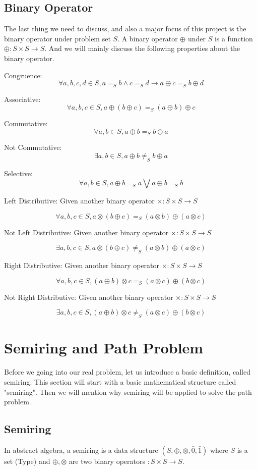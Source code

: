 \documentclass[a4paper,10pt]{article}
\newcommand{\e}[2]{
\begin{equation}
  \label{#1} 
  #2
\end{equation}
}
\begin{document}
\subsection{Binary Operator}
The last thing we need to discuss, and also a major focus of this project is the binary operator under problem set $S$. A binary operator $\oplus$ under $S$ is a function $\oplus : S \times S \rightarrow S$. And we will mainly discuss the following  properties about the binary operator.

Congruence: \e{def:bop:congruence}{\forall a,b,c,d \in S, a =_S b \wedge c =_S d \rightarrow a \oplus c =_S b \oplus d}
Associative: \e{def:bop:associative}{\forall a,b,c \in S, a \oplus (b \oplus c) =_S (a \oplus b) \oplus c}
Commutative: \e{def:bop:commutative}{\forall a,b \in S, a \oplus b =_S b \oplus a}
Not Commutative: \e{def:bop:not_commutative}{\exists a,b \in S, a \oplus b \neq_S b \oplus a}
Selective: \e{def:bop:selective}{\forall a,b \in S, a \oplus b =_S a \bigvee a \oplus b =_S b}
Left Distributive: Given another binary operator $\times : S \times S \rightarrow S$
\e{def:bop:left_distributive}{\forall a,b,c \in S, a \otimes (b \oplus c) =_S (a \otimes b) \oplus (a \otimes c)}
Not Left Distributive: Given another binary operator $\times : S \times S \rightarrow S$
\e{def:bop:not_left_distributive}{\exists a,b,c \in S, a \otimes (b \oplus c) \neq_S (a \otimes b) \oplus (a \otimes c)}
Right Distributive: Given another binary operator $\times : S \times S \rightarrow S$
\e{def:bop:right_distributive}{\forall a,b,c \in S, (a \oplus b) \otimes c =_S (a \otimes c) \oplus (b \otimes c)}
Not Right Distributive: Given another binary operator $\times : S \times S \rightarrow S$
\e{def:bop:not_right_distributive}{\exists a,b,c \in S, (a \oplus b) \otimes c \neq_S (a \otimes c) \oplus (b \otimes c)}

\section{Semiring and Path Problem}
Before we going into our real problem, let us introduce a basic definition, called semiring. This section will start with a basic mathematical structure called "semiring". Then we will mention why semiring will be applied to solve the path problem. 
\subsection{Semiring}
In abstract algebra, a semiring is a data structure $(S,\oplus,\otimes,\bar0,\bar1)$ where $S$ is a set (Type) and $\oplus,\otimes$ are two binary operators $:S\times S \rightarrow S$.
\end{document}
